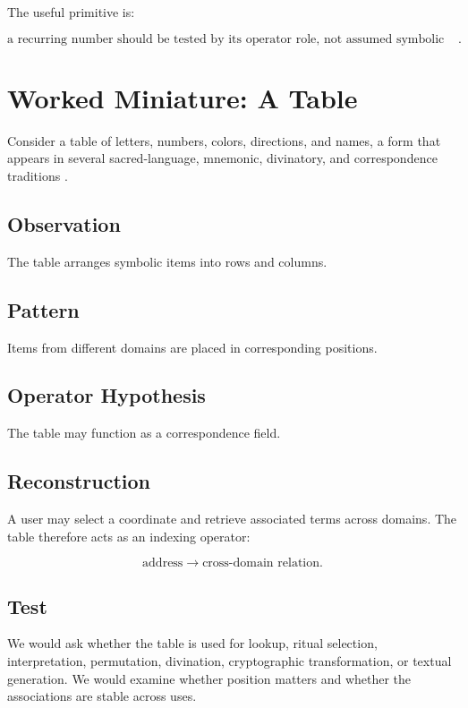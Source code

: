\documentclass[11pt]{book}
\begin{document}
The useful primitive is:

\[
\text{a recurring number should be tested by its operator role, not assumed symbolic meaning}.
\]

\section{Worked Miniature: A Table}

Consider a table of letters, numbers, colors, directions, and names, a form that appears in several sacred-language, mnemonic, divinatory, and correspondence traditions \cite{Yates1966ArtMemory,Eco1995SearchPerfectLanguage,Scholem1974Kabbalah,Idel1988KabbalahNewPerspectives}.

\subsection{Observation}

The table arranges symbolic items into rows and columns.

\subsection{Pattern}

Items from different domains are placed in corresponding positions.

\subsection{Operator Hypothesis}

The table may function as a correspondence field.

\subsection{Reconstruction}

A user may select a coordinate and retrieve associated terms across domains. The table therefore acts as an indexing operator:

\[
\text{address} \longrightarrow \text{cross-domain relation}.
\]

\subsection{Test}

We would ask whether the table is used for lookup, ritual selection, interpretation, permutation, divination, cryptographic transformation, or textual generation. We would examine whether position matters and whether the associations are stable across uses.
\end{document}
